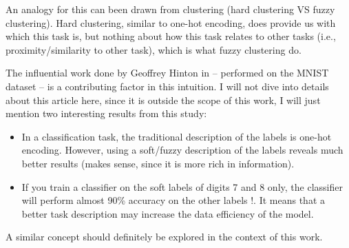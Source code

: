 An analogy for this can been drawn from clustering (hard clustering VS fuzzy clustering). Hard clustering, similar to one-hot encoding, does provide us with which this task is, but nothing about how this task relates to other tasks (i.e., proximity/similarity to other task), which is what fuzzy clustering do.

The influential work done by Geoffrey Hinton in \cite{hinton2015distilling} -- performed on the MNIST dataset \cite{lecun-mnisthandwrittendigit-2010} -- is a contributing factor in this intuition. I will not dive into details about this article here, since it is outside the scope of this work, I will just mention two interesting results from this study:
\begin{itemize}[noitemsep]
    \item In a classification task, the traditional description of the labels is one-hot encoding. However, using a soft/fuzzy description of the labels reveals much better results (makes sense, since it is more rich in information).
    \item If you train a classifier on the soft labels of digits 7 and 8 only, the classifier will perform almost 90\% accuracy on the other labels !. It means that a better task description may increase the data efficiency of the model.
\end{itemize}
A similar concept should definitely be explored in the context of this work.


